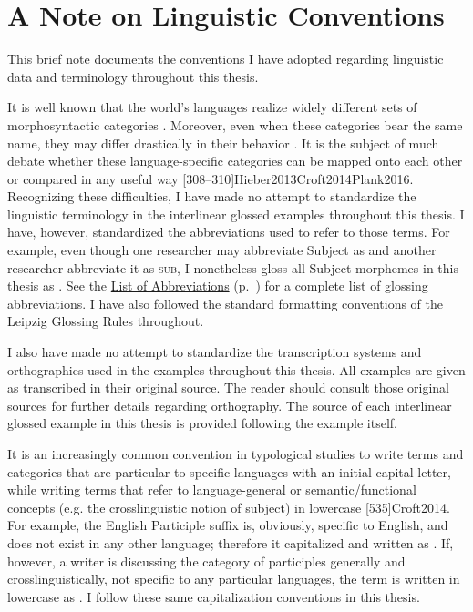 \chapter*{A Note on Linguistic Conventions}
\label{ch:conventions}

This brief note documents the conventions I have adopted regarding linguistic data and terminology throughout this thesis.

It is well known that the world's languages realize widely different sets of morphosyntactic categories . Moreover, even when these categories bear the same name, they may differ drastically in their behavior \citep[9]{Dixon2010}. It is the subject of much debate whether these language-specific categories can be mapped onto each other or compared in any useful way [308--310]{Hieber2013}{Croft2014}{Plank2016}. Recognizing these difficulties, I have made no attempt to standardize the linguistic terminology in the interlinear glossed examples throughout this thesis. I have, however, standardized the abbreviations used to refer to those terms. For example, even though one researcher may abbreviate Subject as  and another researcher abbreviate it as \textsc{sub}, I nonetheless gloss all Subject morphemes in this thesis as . See the \hyperref[ch:abbreviations]{List of Abbreviations} (p.~\pageref{ch:abbreviations}) for a complete list of glossing abbreviations. I have also followed the standard formatting conventions of the Leipzig Glossing Rules \citep{BickelComrieHaspelmath2015} throughout.

I also have made no attempt to standardize the transcription systems and orthographies used in the examples throughout this thesis. All examples are given as transcribed in their original source. The reader should consult those original sources for further details regarding orthography. The source of each interlinear glossed example in this thesis is provided following the example itself.

It is an increasingly common convention in typological studies to write terms and categories that are particular to specific languages with an initial capital letter, while writing terms that refer to language-general or semantic/functional concepts (e.g. the crosslinguistic notion of subject) in lowercase [535]{Croft2014}. For example, the English Participle suffix  is, obviously, specific to English, and does not exist in any other language; therefore it capitalized and written as . If, however, a writer is discussing the category of participles generally and crosslinguistically, not specific to any particular languages, the term is written in lowercase as . I follow these same capitalization conventions in this thesis.

